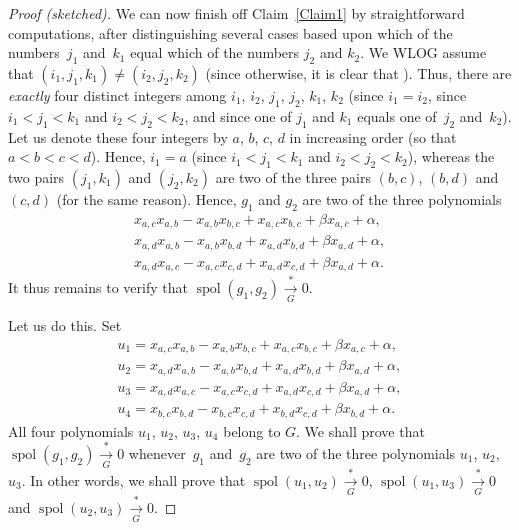 \documentclass[pdftex]{sigma}
\numberwithin{equation}{section}
\begin{document}
\begin{proof}[Proof (sketched)]
We can now finish off Claim~\ref{Claim1} by straightforward computations, after distinguishing several cases based upon which of the numbers~$j_{1}$ and~$k_{1}$ equal which of the numbers $j_{2}$ and $k_{2}$. We WLOG assume that $( i_{1},j_{1},k_{1}) \neq( i_{2},j_{2},k_{2})$
(since otherwise, it is clear that ). Thus, there are \textit{exactly} four distinct integers among $i_{1}$, $i_{2}$, $j_{1}$, $j_{2}$, $k_{1}$, $k_{2}$ (since $i_{1}=i_{2}$, since $i_{1}<j_{1}<k_{1}$ and $i_{2}<j_{2}<k_{2}$, and since one of $j_{1}$ and $k_{1}$ equals one of~$j_{2}$ and~$k_{2}$). Let us denote these four integers by $a$, $b$, $c$, $d$ in increasing order (so that $a<b<c<d$). Hence, $i_{1}=a$ (since $i_{1}<j_{1}<k_{1}$ and $i_{2}<j_{2}<k_{2}$), whereas the two pairs $(j_{1},k_{1}) $ and $( j_{2},k_{2}) $ are two of the three pairs $( b,c) $, $( b,d) $ and $( c,d)$ (for the same reason). Hence, $g_{1}$ and $g_{2}$ are two of the three polynomials
\begin{gather*}
 x_{a,c}x_{a,b}-x_{a,b}x_{b,c}+x_{a,c}x_{b,c}+\beta x_{a,c}+\alpha,\\
x_{a,d}x_{a,b}-x_{a,b}x_{b,d}+x_{a,d}x_{b,d}+\beta x_{a,d}+\alpha,\\
x_{a,d}x_{a,c}-x_{a,c}x_{c,d}+x_{a,d}x_{c,d}+\beta x_{a,d}+\alpha.
\end{gather*}
It thus remains to verify that $\operatorname*{spol} ( g_{1},g_{2}) \overset{\ast}{\underset{G}{\longrightarrow}}0$.

Let us do this. Set
\begin{gather*}
u_{1} =x_{a,c}x_{a,b}-x_{a,b}x_{b,c}+x_{a,c}x_{b,c}+\beta x_{a,c}+\alpha,\\
u_{2} =x_{a,d}x_{a,b}-x_{a,b}x_{b,d}+x_{a,d}x_{b,d}+\beta x_{a,d}+\alpha,\\
u_{3} =x_{a,d}x_{a,c}-x_{a,c}x_{c,d}+x_{a,d}x_{c,d}+\beta x_{a,d}+\alpha,\\
u_{4} =x_{b,c}x_{b,d}-x_{b,c}x_{c,d}+x_{b,d}x_{c,d}+\beta x_{b,d}+\alpha.
\end{gather*}
All four polynomials $u_{1}$, $u_{2}$, $u_{3}$, $u_{4}$ belong to $G$. We shall prove that $\operatorname*{spol}( g_{1},g_{2}) \overset{\ast
}{\underset{G}{\longrightarrow}}0$ whenever~$g_{1}$ and~$g_{2}$ are two of the three polynomials $u_{1}$, $u_{2}$, $u_{3}$. In other words, we shall prove that $\operatorname*{spol} ( u_{1},u_{2} ) \overset{\ast }{\underset{G}{\longrightarrow}}0$, $\operatorname*{spol}( u_{1},u_{3}) \overset{\ast}{\underset{G}{\longrightarrow}}0$ and $\operatorname*{spol}( u_{2},u_{3}) \overset{\ast}{\underset{G}{\longrightarrow}}0$.


\end{proof}
\end{document}
